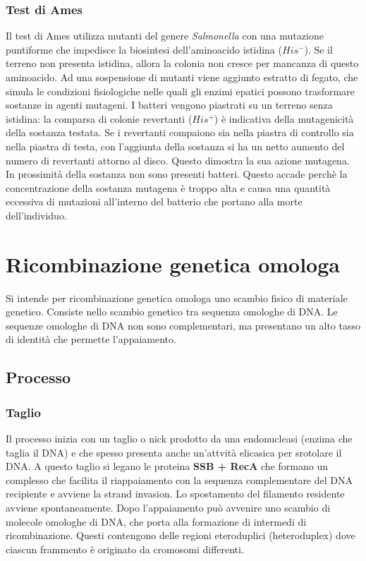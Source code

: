 		\subsubsection{Test di Ames}
		Il test di Ames utilizza mutanti del genere \textit{Salmonella} con una mutazione puntiforme che impedisce la biosintesi dell'aminoacido istidina (\emph{$His^{-}$}). 
		Se il terreno non presenta istidina, allora la colonia non cresce per mancanza di questo aminoacido. 
		Ad una sospensione di mutanti viene aggiunto estratto di fegato, che simula le condizioni fisiologiche nelle quali gli enzimi epatici possono trasformare sostanze  in agenti mutageni. 
		I batteri vengono piastrati su un terreno senza istidina: la comparsa di colonie revertanti (\emph{$His^{+}$}) è indicativa della mutagenicità della sostanza testata.
		Se i revertanti compaiono sia nella piastra di controllo sia nella piastra di testa, con l'aggiunta della sostanza si ha un netto aumento del numero di revertanti attorno al disco. 
		Questo dimostra la sua azione mutagena. 
		In prossimità della sostanza non sono presenti batteri. 
		Questo accade perchè la concentrazione della sostanza mutagena è troppo alta e causa una quantità eccessiva di mutazioni all'interno del batterio che portano alla morte dell'individuo.

\section{Ricombinazione genetica omologa}
Si intende per ricombinazione genetica omologa uno scambio fisico di materiale genetico. 
Consiste nello scambio genetico tra sequenza omologhe di DNA. 
Le sequenze omologhe di DNA non sono complementari, ma presentano un alto tasso di identità che permette l'appaiamento. 

	\subsection{Processo}

		\subsubsection{Taglio}
		Il processo inizia con un taglio o nick prodotto da una endonucleasi (enzima che taglia il DNA) e che spesso presenta anche un'attvità elicasica per srotolare il DNA. 
		A questo taglio si legano le proteina \textbf{SSB + RecA} che formano un complesso che facilita il riappaiamento con la sequenza complementare del DNA recipiente e avviene la strand invasion.
		Lo spostamento del filamento residente avviene spontaneamente.
		Dopo l'appaiamento può avvenire uno scambio di molecole omologhe di DNA, che porta alla formazione di intermedi di ricombinazione. 
		Questi contengono delle regioni eteroduplici (heteroduplex) dove ciascun frammento è originato da cromosomi differenti. 

